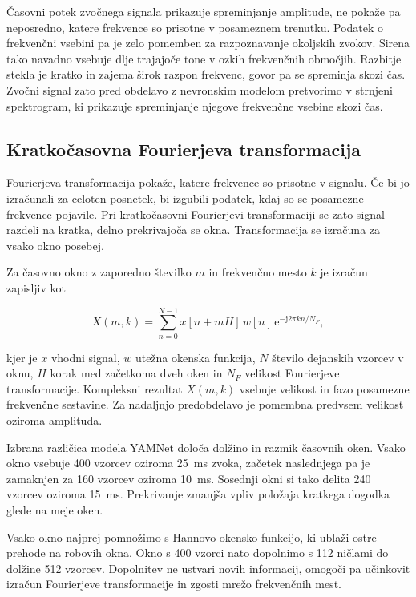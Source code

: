 Časovni potek zvočnega signala prikazuje spreminjanje amplitude, ne pokaže pa
neposredno, katere frekvence so prisotne v posameznem trenutku. Podatek o
frekvenčni vsebini pa je zelo pomemben za razpoznavanje okoljskih zvokov. Sirena tako
navadno vsebuje dlje trajajoče tone v ozkih frekvenčnih območjih. Razbitje
stekla je kratko in zajema širok razpon frekvenc, govor pa se spreminja skozi
čas. Zvočni signal zato pred obdelavo z nevronskim modelom pretvorimo v
strnjeni spektrogram, ki prikazuje spreminjanje njegove frekvenčne vsebine
skozi čas.

\subsection{Kratkočasovna Fourierjeva transformacija}

Fourierjeva transformacija pokaže, katere frekvence so prisotne v signalu. Če
bi jo izračunali za celoten posnetek, bi izgubili podatek, kdaj so se posamezne
frekvence pojavile. Pri kratkočasovni Fourierjevi transformaciji se zato signal razdeli na kratka,
delno prekrivajoča se okna. Transformacija se izračuna za vsako okno posebej.

Za časovno okno z zaporedno številko $m$ in frekvenčno mesto $k$ je izračun
zapisljiv kot

\begin{equation}
  X(m,k) = \sum_{n=0}^{N-1} x[n+mH]\,w[n]\,
  \mathrm{e}^{-\mathrm{j}2\pi kn/N_F},
  \label{eq:stft}
\end{equation}

kjer je $x$ vhodni signal, $w$ utežna okenska funkcija, $N$ število dejanskih
vzorcev v oknu, $H$ korak med začetkoma dveh oken in $N_F$ velikost
Fourierjeve transformacije. Kompleksni rezultat $X(m,k)$ vsebuje velikost in
fazo posamezne frekvenčne sestavine. Za nadaljnjo predobdelavo je pomembna
predvsem velikost oziroma amplituda.

Izbrana različica modela YAMNet določa dolžino in razmik časovnih oken. Vsako
okno vsebuje 400 vzorcev oziroma \SI{25}{\milli\second} zvoka, začetek
naslednjega pa je zamaknjen za 160 vzorcev oziroma
\SI{10}{\milli\second}. Sosednji okni si tako delita 240 vzorcev oziroma
\SI{15}{\milli\second}. Prekrivanje zmanjša vpliv položaja kratkega dogodka glede
na meje oken.

Vsako okno najprej pomnožimo s Hannovo okensko funkcijo, ki ublaži ostre
prehode na robovih okna. Okno s 400 vzorci nato dopolnimo s 112 ničlami do
dolžine 512 vzorcev. Dopolnitev ne ustvari novih informacij, omogoči pa učinkovit
izračun Fourierjeve transformacije in zgosti mrežo frekvenčnih mest.

